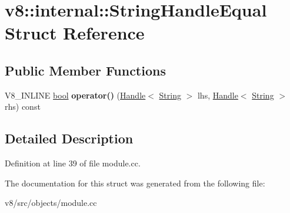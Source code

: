 \hypertarget{structv8_1_1internal_1_1StringHandleEqual}{}\section{v8\+:\+:internal\+:\+:String\+Handle\+Equal Struct Reference}
\label{structv8_1_1internal_1_1StringHandleEqual}
\subsection*{Public Member Functions}
\begin{DoxyCompactItemize}
\item 
\mbox{\label{structv8_1_1internal_1_1StringHandleEqual_a19a66cc9e3913e4c7043abf38d0a7893}} 
V8\+\_\+\+I\+N\+L\+I\+NE \mbox{\hyperlink{classbool}{bool}} {\bfseries operator()} (\mbox{\hyperlink{classv8_1_1internal_1_1Handle}{Handle}}$<$ \mbox{\hyperlink{classv8_1_1internal_1_1String}{String}} $>$ lhs, \mbox{\hyperlink{classv8_1_1internal_1_1Handle}{Handle}}$<$ \mbox{\hyperlink{classv8_1_1internal_1_1String}{String}} $>$ rhs) const
\end{DoxyCompactItemize}


\subsection{Detailed Description}


Definition at line 39 of file module.\+cc.



The documentation for this struct was generated from the following file\+:\begin{DoxyCompactItemize}
\item 
v8/src/objects/module.\+cc\end{DoxyCompactItemize}
